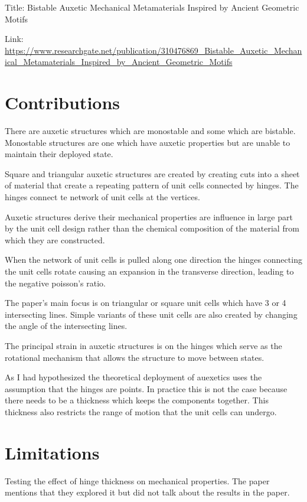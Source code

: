 \documentclass{article}
\begin{document}
    
Title: Bistable Auxetic Mechanical Metamaterials Inspired by Ancient Geometric Motifs

Link: \url{https://www.researchgate.net/publication/310476869_Bistable_Auxetic_Mechanical_Metamaterials_Inspired_by_Ancient_Geometric_Motifs}

\section*{Contributions}
There are auxetic structures which are monostable and some which are bistable. Monostable
structures are one which have auxetic properties but are unable to maintain their deployed
state. 

Square and triangular auxetic structures are created by creating cuts into a sheet of 
material that create a repeating pattern of unit cells connected by hinges. The hinges
connect te network of unit cells at the vertices. 

Auxetic structures derive their mechanical properties are influence in large part by the 
unit cell design rather than the chemical composition of the material from which they are
constructed. 

When the network of unit cells is pulled along one direction the hinges connecting the
unit cells rotate causing an expansion in the transverse direction, leading to the 
negative poisson's ratio. 

The paper's main focus is on triangular or square unit cells which have 3 or 4 intersecting
lines. Simple variants of these unit cells are also created by changing the angle of the 
intersecting lines. 

The principal strain in auxetic structures is on the hinges which serve as the rotational
mechanism that allows the structure to move between states. 

As I had hypothesized the theoretical deployment of auexetics uses the assumption that 
the hinges are points. In practice this is not the case because there needs to be a 
thickness which keeps the components together. This thickness also restricts the range 
of motion that the unit cells can undergo. 



\section*{Limitations}
Testing the effect of hinge thickness on mechanical properties. The paper mentions that 
they explored it but did not talk about the results in the paper. 
\end{document}
